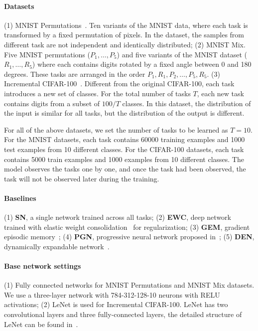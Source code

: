 \documentclass{article}
\begin{document}
\paragraph{Datasets}
(1) MNIST Permutations~\cite{kirkpatrick1}. Ten variants of the MNIST data, where each task is transformed by a fixed permutation of
pixels. In the dataset, the samples from different task are not independent and identically distributed;
(2) MNIST Mix. Five MNIST permutations ($P_1,\dots,P_5$) and five variants of the MNIST dataset ($R_1,\dots,R_5$) where each contains digits rotated by a fixed angle between 0 and 180 degrees. These tasks are arranged in the order $P_1,R_1, P_2,\dots,P_5,R_5$.
(3) Incremental CIFAR-100~\cite{icart}. Different from the original CIFAR-100, each task introduces a new set of classes. For the total number of tasks $T$, each new task contains digits from a subset of $100/T$ classes. In this dataset, the distribution of the input is similar for all tasks, but the distribution of the output is different.

For all of the above datasets, we set the number of tasks to be learned as $T = 10$. For the MNIST datasets, each task contains 60000 training examples and 1000 test examples from 10 different classes. For the CIFAR-100 datasets, each task contains 5000 train examples and 1000 examples from 10 different classes. The model observes the tasks one by one, and once the task had been observed, the task will not be observed later during the training.


\paragraph{Baselines}
(1) \textbf{SN}, a single network trained across all tasks;
(2) \textbf{EWC}, deep network trained with elastic weight consolidation~\cite{kirkpatrick1} for regularization;
(3) \textbf{GEM}, gradient episodic memory~\cite{GradientEpisodicMemory};
(4) \textbf{PGN}, progressive neural network proposed in~\cite{rusu1};
(5) \textbf{DEN}, dynamically expandable network~\cite{yoon1}.

\paragraph{Base network settings}
(1) Fully con{}nected networks for  MNIST Permutations and MNIST Mix datasets. We use a three-layer network with 784-312-128-10 neurons with RELU activations;
(2) LeNet is used for Incremental CIFAR-100. LeNet has two convolutional layers and three fully-connected layers, the detailed structure of {}LeNet can be found in~\cite{lenet1}.
\end{document}
